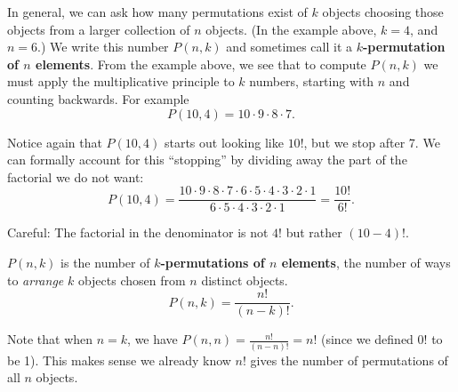 \documentclass[11pt,]{book}
\newcommand{\terminology}[1]{\textbf{#1}}
\theoremstyle{ptxplainnotitle}
\theoremstyle{ptxplaintitle}
\theoremstyle{ptxdefinitionnotitle}
\theoremstyle{ptxdefinitiontitle}
\theoremstyle{ptxdefinitionnotitle}
\theoremstyle{ptxdefinitiontitle}
\theoremstyle{ptxdefinitionnotitle}
\theoremstyle{ptxdefinitiontitle}
\theoremstyle{ptxdefinitiontitlenonumber}
\theoremstyle{ptxdefinitiontitlenonumber}
\numberwithin{equation}{chapter}
\begin{document}
\hypertarget{p-1526}{}%
In general, we can ask how many permutations exist of \(k\) objects choosing those objects from a larger collection of \(n\) objects. (In the example above, \(k = 4\), and \(n = 6\).) We write this number \(P(n,k)\) and sometimes call it a \terminology{\(k\)-permutation of \(n\) elements}. From the example above, we see that to compute \(P(n,k)\) we must apply the multiplicative principle to \(k\) numbers, starting with \(n\) and counting backwards. For example%
\begin{equation*}
P(10, 4) = 10\cdot 9 \cdot 8 \cdot 7.
\end{equation*}
%
\par
\hypertarget{p-1527}{}%
Notice again that \(P(10,4)\) starts out looking like \(10!\), but we stop after 7. We can formally account for this ``stopping'' by dividing away the part of the factorial we do not want:%
\begin{equation*}
P(10,4) = \frac{10\cdot 9 \cdot 8 \cdot 7 \cdot 6 \cdot 5 \cdot 4 \cdot 3 \cdot 2 \cdot 1}{6 \cdot 5 \cdot 4 \cdot 3 \cdot 2 \cdot 1} = \frac{10!}{6!}.
\end{equation*}
%
\par
\hypertarget{p-1528}{}%
Careful: The factorial in the denominator is not \(4!\) but rather \((10-4)!\).%
\begin{assemblage}\label{assemblage-22}
\hypertarget{p-1529}{}%
 \(P(n,k)\) is the number of \terminology{\(k\)-permutations of \(n\) elements}, the number of ways to \emph{arrange} \(k\) objects chosen from \(n\) distinct objects.%
\begin{equation*}
P(n,k) = \frac{n!}{(n-k)!}.
\end{equation*}
%
\end{assemblage}
\hypertarget{p-1530}{}%
Note that when \(n = k\), we have \(P(n,n) = \frac{n!}{(n-n)!} = n!\) (since we defined \(0!\) to be 1). This makes sense \textemdash{}we already know \(n!\) gives the number of permutations of all \(n\) objects.%
\end{document}
